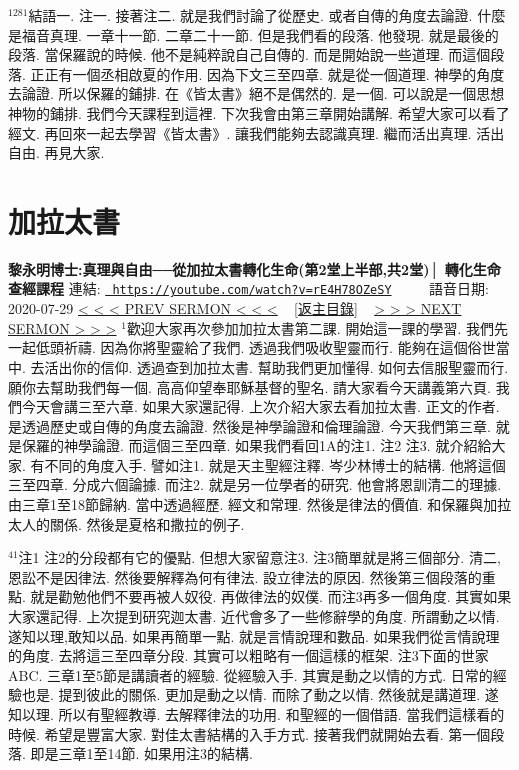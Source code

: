 \documentclass{book}
\begin{document}
$^{1281}$結語一.
注一.
接著注二.
就是我們討論了從歷史.
或者自傳的角度去論證.
什麼是福音真理.
一章十一節.
二章二十一節.
但是我們看的段落.
他發現.
就是最後的段落.
當保羅說的時候.
他不是純粹說自己自傳的.
而是開始說一些道理.
而這個段落.
正正有一個丞相啟夏的作用.
因為下文三至四章.
就是從一個道理.
神學的角度去論證.
所以保羅的鋪排.
在《皆太書》絕不是偶然的.
是一個.
可以說是一個思想神物的鋪排.
我們今天課程到這裡.
下次我會由第三章開始講解.
希望大家可以看了經文.
再回來一起去學習《皆太書》.
讓我們能夠去認識真理.
繼而活出真理.
活出自由.
再見大家.
\newpage



\section{加拉太書}
\label{sec:rE4H78OZeSY}
\textbf{黎永明博士:真理與自由──從加拉太書轉化生命(第2堂上半部,共2堂)│ 轉化生命查經課程}
\newline
\newline
連結: \href{https://youtube.com/watch?v=rE4H78OZeSY}{\texttt{ https://youtube.com/watch?v=rE4H78OZeSY}} ~~~~ 語音日期: 2020-07-29 
\newline
\newline
\hyperref[sec:cDT6pcxcIlQ]{\small{< < < PREV SERMON < < <}}
~
\hyperref[sec:index]{\small{[返主目錄]}}
~
\hyperref[sec:AHag0CgcAJk]{\small{> > > NEXT SERMON > > >}}
\newline
\newline
$^{1}$歡迎大家再次參加加拉太書第二課.
開始這一課的學習.
我們先一起低頭祈禱.
因為你將聖靈給了我們.
透過我們吸收聖靈而行.
能夠在這個俗世當中.
去活出你的信仰.
透過查到加拉太書.
幫助我們更加懂得.
如何去信服聖靈而行.
願你去幫助我們每一個.
高高仰望奉耶穌基督的聖名.
請大家看今天講義第六頁.
我們今天會講三至六章.
如果大家還記得.
上次介紹大家去看加拉太書.
正文的作者.
是透過歷史或自傳的角度去論證.
然後是神學論證和倫理論證.
今天我們第三章.
就是保羅的神學論證.
而這個三至四章.
如果我們看回1A的注1.
注2 注3.
就介紹給大家.
有不同的角度入手.
譬如注1.
就是天主聖經注釋.
岑少林博士的結構.
他將這個三至四章.
分成六個論據.
而注2.
就是另一位學者的研究.
他會將恩訓清二的理據.
由三章1至18節歸納.
當中透過經歷.
經文和常理.
然後是律法的價值.
和保羅與加拉太人的關係.
然後是夏格和撒拉的例子.

$^{41}$注1 注2的分段都有它的優點.
但想大家留意注3.
注3簡單就是將三個部分.
清二,恩訟不是因律法.
然後要解釋為何有律法.
設立律法的原因.
然後第三個段落的重點.
就是勸勉他們不要再被人奴役.
再做律法的奴僕.
而注3再多一個角度.
其實如果大家還記得.
上次提到研究迦太書.
近代會多了一些修辭學的角度.
所謂動之以情.
遂知以理,敢知以品.
如果再簡單一點.
就是言情說理和數品.
如果我們從言情說理的角度.
去將這三至四章分段.
其實可以粗略有一個這樣的框架.
注3下面的世家ABC.
三章1至5節是講讀者的經驗.
從經驗入手.
其實是動之以情的方式.
日常的經驗也是.
提到彼此的關係.
更加是動之以情.
而除了動之以情.
然後就是講道理.
遂知以理.
所以有聖經教導.
去解釋律法的功用.
和聖經的一個借語.
當我們這樣看的時候.
希望是豐富大家.
對佳太書結構的入手方式.
接著我們就開始去看.
第一個段落.
即是三章1至14節.
如果用注3的結構.
\end{document}
